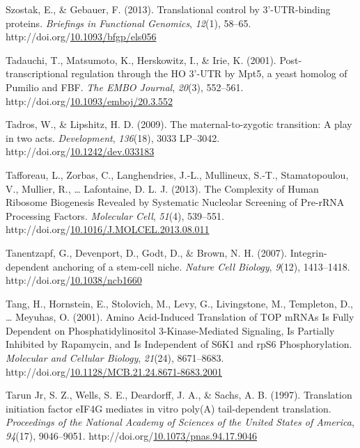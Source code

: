 \documentclass[12pt,oneside]{reedthesis}
\newlength{\cslhangindent}
\newenvironment{CSLReferences}[2] %
 {%
  \setlength{\parindent}{0pt}
  \ifodd #1 \everypar{\setlength{\hangindent}{\cslhangindent}}\ignorespaces\fi
  \ifnum #2 > 0
  \setlength{\parskip}{#2\baselineskip}
  \fi
 }%
 {}
\begin{document}
\begin{CSLReferences}{1}{0}
\leavevmode{}%
Szostak, E., \& Gebauer, F. (2013). Translational control by 3'-{UTR}-binding proteins. \emph{Briefings in Functional Genomics}, \emph{12}(1), 58--65. http://doi.org/\href{https://doi.org/10.1093/bfgp/els056}{10.1093/bfgp/els056}

\leavevmode{}%
Tadauchi, T., Matsumoto, K., Herskowitz, I., \& Irie, K. (2001). Post-transcriptional regulation through the {HO} 3'-{UTR} by {Mpt5}, a yeast homolog of {Pumilio} and {FBF}. \emph{The EMBO Journal}, \emph{20}(3), 552--561. http://doi.org/\href{https://doi.org/10.1093/emboj/20.3.552}{10.1093/emboj/20.3.552}

\leavevmode{}%
Tadros, W., \& Lipshitz, H. D. (2009). The maternal-to-zygotic transition: A play in two acts. \emph{Development}, \emph{136}(18), 3033 LP--3042. http://doi.org/\href{https://doi.org/10.1242/dev.033183}{10.1242/dev.033183}

\leavevmode{}%
Tafforeau, L., Zorbas, C., Langhendries, J.-L., Mullineux, S.-T., Stamatopoulou, V., Mullier, R., \ldots{} Lafontaine, D. L. J. (2013). The {Complexity} of {Human Ribosome Biogenesis Revealed} by {Systematic Nucleolar Screening} of {Pre}-{rRNA Processing Factors}. \emph{Molecular Cell}, \emph{51}(4), 539--551. http://doi.org/\href{https://doi.org/10.1016/J.MOLCEL.2013.08.011}{10.1016/J.MOLCEL.2013.08.011}

\leavevmode{}%
Tanentzapf, G., Devenport, D., Godt, D., \& Brown, N. H. (2007). Integrin-dependent anchoring of a stem-cell niche. \emph{Nature Cell Biology}, \emph{9}(12), 1413--1418. http://doi.org/\href{https://doi.org/10.1038/ncb1660}{10.1038/ncb1660}

\leavevmode{}%
Tang, H., Hornstein, E., Stolovich, M., Levy, G., Livingstone, M., Templeton, D., \ldots{} Meyuhas, O. (2001). Amino {Acid}-{Induced Translation} of {TOP mRNAs Is Fully Dependent} on {Phosphatidylinositol} 3-{Kinase}-{Mediated Signaling}, {Is Partially Inhibited} by {Rapamycin}, and {Is Independent} of {S6K1} and {rpS6 Phosphorylation}. \emph{Molecular and Cellular Biology}, \emph{21}(24), 8671--8683. http://doi.org/\href{https://doi.org/10.1128/MCB.21.24.8671-8683.2001}{10.1128/MCB.21.24.8671-8683.2001}

\leavevmode{}%
Tarun Jr, S. Z., Wells, S. E., Deardorff, J. A., \& Sachs, A. B. (1997). Translation initiation factor {eIF4G} mediates in vitro poly({A}) tail-dependent translation. \emph{Proceedings of the National Academy of Sciences of the United States of America}, \emph{94}(17), 9046--9051. http://doi.org/\href{https://doi.org/10.1073/pnas.94.17.9046}{10.1073/pnas.94.17.9046}


\end{CSLReferences}
\end{document}
